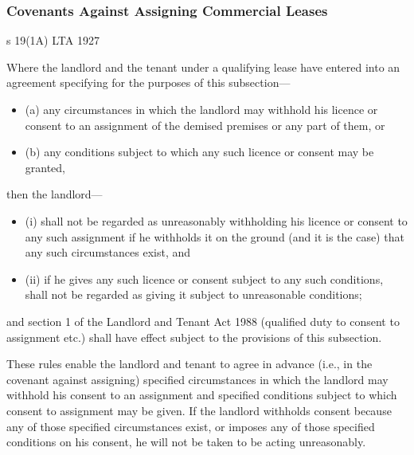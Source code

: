 \documentclass[
]{article}
\providecommand{\tightlist}{%
  \setlength{\itemsep}{0pt}\setlength{\parskip}{0pt}}
\newenvironment{env-2aad614f-6fd6-4025-876c-fcdbeae766fb}
{
    \savenotes\tcolorbox[blanker,breakable,left=5pt,borderline west={2pt}{-4pt}{green}]
}
{
    \endtcolorbox\spewnotes
}
\begin{document}
\hypertarget{covenants-against-assigning-commercial-leases}{%
\subsubsection{Covenants Against Assigning Commercial
Leases}\label{covenants-against-assigning-commercial-leases}}

\begin{env-2aad614f-6fd6-4025-876c-fcdbeae766fb}

s 19(1A) LTA 1927

Where the landlord and the tenant under a qualifying lease have entered
into an agreement specifying for the purposes of this subsection---

\begin{itemize}
\tightlist
\item
  (a) any circumstances in which the landlord may withhold his licence
  or consent to an assignment of the demised premises or any part of
  them, or
\item
  (b) any conditions subject to which any such licence or consent may be
  granted,
\end{itemize}

then the landlord---

\begin{itemize}
\tightlist
\item
  (i) shall not be regarded as unreasonably withholding his licence or
  consent to any such assignment if he withholds it on the ground (and
  it is the case) that any such circumstances exist, and
\item
  (ii) if he gives any such licence or consent subject to any such
  conditions, shall not be regarded as giving it subject to unreasonable
  conditions;
\end{itemize}

and section 1 of the Landlord and Tenant Act 1988 (qualified duty to
consent to assignment etc.) shall have effect subject to the provisions
of this subsection.

\end{env-2aad614f-6fd6-4025-876c-fcdbeae766fb}

These rules enable the landlord and tenant to agree in advance (i.e., in
the covenant against assigning) specified circumstances in which the
landlord may withhold his consent to an assignment and specified
conditions subject to which consent to assignment may be given. If the
landlord withholds consent because any of those specified circumstances
exist, or imposes any of those specified conditions on his consent, he
will not be taken to be acting unreasonably.
\end{document}
